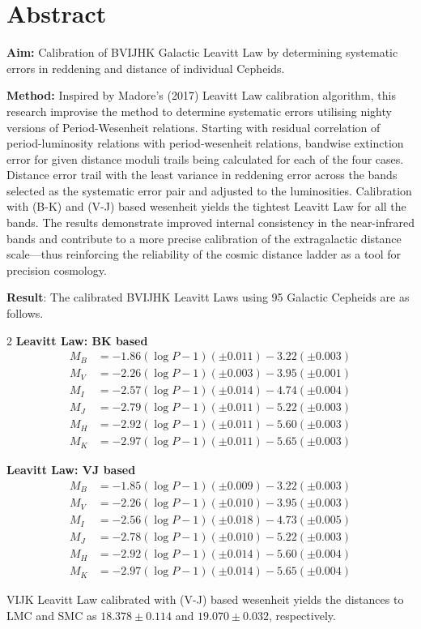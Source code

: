 \chapter*{Abstract}
\textbf{Aim:} Calibration of BVIJHK Galactic Leavitt Law by determining systematic errors in reddening and distance of individual Cepheids.

\textbf{Method:} Inspired by Madore's (2017) Leavitt Law calibration algorithm, this research improvise the method to determine systematic errors utilising nighty versions of Period-Wesenheit relations. Starting with residual correlation of period-luminosity relations with period-wesenheit relations, bandwise extinction error for given distance moduli trails being calculated for each of the four cases. Distance error trail with the least variance in reddening error across the bands selected as the systematic error pair and adjusted to the luminosities. Calibration with (B-K) and (V-J) based wesenheit yields the tightest Leavitt Law for all the bands. The results demonstrate improved internal consistency in the near-infrared bands and contribute to a more precise calibration of the extragalactic distance scale—thus reinforcing the reliability of the cosmic distance ladder as a tool for precision cosmology.

\textbf{Result}: The calibrated BVIJHK Leavitt Laws using 95 Galactic Cepheids are as follows.


\begin{multicols}{2}
\centering \textbf{Leavitt Law: BK based} \\
\vspace{-0.5cm}
{\small
\begin{align*}
M_B & = -1.86(\log P - 1)(\pm 0.011)  -3.22(\pm 0.003)\\
M_V & = -2.26(\log P - 1)(\pm 0.003)  -3.95(\pm 0.001)\\
M_I & = -2.57(\log P - 1)(\pm 0.014)  -4.74(\pm 0.004)\\
M_J & = -2.79(\log P - 1)(\pm 0.011)  -5.22(\pm 0.003)\\
M_H & = -2.92(\log P - 1)(\pm 0.011)  -5.60(\pm 0.003)\\
M_K & = -2.97(\log P - 1)(\pm 0.011)  -5.65(\pm 0.003)
\end{align*}
}
\vfill %

\columnbreak

\centering \textbf{Leavitt Law: VJ based} \\
\vspace{-0.5cm}
{\small
\begin{align*}
M_B & = -1.85(\log P - 1)(\pm 0.009)  -3.22(\pm 0.003)\\
M_V & = -2.26(\log P - 1)(\pm 0.010)  -3.95(\pm 0.003)\\
M_I & = -2.56(\log P - 1)(\pm 0.018)  -4.73(\pm 0.005)\\
M_J & = -2.78(\log P - 1)(\pm 0.010)  -5.22(\pm 0.003)\\
M_H & = -2.92(\log P - 1)(\pm 0.014)  -5.60(\pm 0.004)\\
M_K & = -2.97(\log P - 1)(\pm 0.014)  -5.65(\pm 0.004)
\end{align*}
}
\end{multicols}


VIJK Leavitt Law calibrated with (V-J) based wesenheit yields the distances to LMC and SMC as $18.378 \pm 0.114$ and $19.070 \pm 0.032$, respectively.
